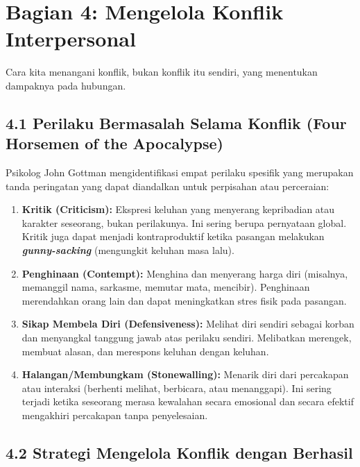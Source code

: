 \documentclass[
  letterpaper,
  DIV=11,
  numbers=noendperiod]{scrreprt}
\providecommand{\tightlist}{%
  \setlength{\itemsep}{0pt}\setlength{\parskip}{0pt}}
\begin{document}
\section{Bagian 4: Mengelola Konflik
Interpersonal}\label{bagian-4-mengelola-konflik-interpersonal}

Cara kita menangani konflik, bukan konflik itu sendiri, yang menentukan
dampaknya pada hubungan.

\subsection{4.1 Perilaku Bermasalah Selama Konflik (Four Horsemen of the
Apocalypse)}\label{perilaku-bermasalah-selama-konflik-four-horsemen-of-the-apocalypse}

Psikolog John Gottman mengidentifikasi empat perilaku spesifik yang
merupakan tanda peringatan yang dapat diandalkan untuk perpisahan atau
perceraian:

\begin{enumerate}
\def\labelenumi{\arabic{enumi}.}
\tightlist
\item
  \textbf{Kritik (Criticism):} Ekspresi keluhan yang menyerang
  kepribadian atau karakter seseorang, bukan perilakunya. Ini sering
  berupa pernyataan global. Kritik juga dapat menjadi kontraproduktif
  ketika pasangan melakukan \textbf{\emph{gunny-sacking}} (mengungkit
  keluhan masa lalu).
\item
  \textbf{Penghinaan (Contempt):} Menghina dan menyerang harga diri
  (misalnya, memanggil nama, sarkasme, memutar mata, mencibir).
  Penghinaan merendahkan orang lain dan dapat meningkatkan stres fisik
  pada pasangan.
\item
  \textbf{Sikap Membela Diri (Defensiveness):} Melihat diri sendiri
  sebagai korban dan menyangkal tanggung jawab atas perilaku sendiri.
  Melibatkan merengek, membuat alasan, dan merespons keluhan dengan
  keluhan.
\item
  \textbf{Halangan/Membungkam (Stonewalling):} Menarik diri dari
  percakapan atau interaksi (berhenti melihat, berbicara, atau
  menanggapi). Ini sering terjadi ketika seseorang merasa kewalahan
  secara emosional dan secara efektif mengakhiri percakapan tanpa
  penyelesaian.
\end{enumerate}

\subsection{4.2 Strategi Mengelola Konflik dengan
Berhasil}\label{strategi-mengelola-konflik-dengan-berhasil}
\end{document}
